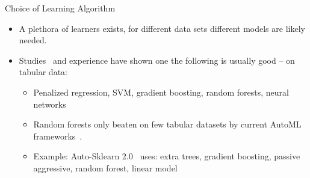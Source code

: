 \begin{frame}{Choice of Learning Algorithm}
  \begin{itemize}
    \item A plethora of learners exists, for different data sets different models
        are likely needed.
    \item Studies~ and experience have shown one the following 
        is usually good -- on tabular data:
    \begin{itemize}
      \item Penalized regression, SVM, gradient boosting, random forests, neural networks
      \item Random forests only beaten on few tabular datasets by current AutoML frameworks~.
      \item Example: Auto-Sklearn 2.0~ uses: extra trees, gradient boosting, passive aggressive, random forest, linear model
    \end{itemize}
  \end{itemize}
\end{frame}

